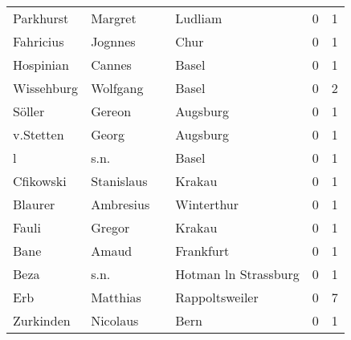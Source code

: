 \begin{center}
\begin{tiny}
\begin{longtabu}{llllrr}
                Parkhurst &                            Margret &             &                                     Ludliam &          0 &         1 \\
                Fahricius &                            Jognnes &             &                                        Chur &          0 &         1 \\
                Hospinian &                             Cannes &             &                                       Basel &          0 &         1 \\
               Wissehburg &                           Wolfgang &             &                                       Basel &          0 &         2 \\
                   Söller &                             Gereon &             &                                    Augsburg &          0 &         1 \\
                v.Stetten &                              Georg &             &                                    Augsburg &          0 &         1 \\
                        l &                               s.n. &             &                                       Basel &          0 &         1 \\
                Cfikowski &                         Stanislaus &             &                                      Krakau &          0 &         1 \\
                  Blaurer &                          Ambresius &             &                                  Winterthur &          0 &         1 \\
                    Fauli &                             Gregor &             &                                      Krakau &          0 &         1 \\
                     Bane &                              Amaud &             &                                   Frankfurt &          0 &         1 \\
                     Beza &                               s.n. &             &                        Hotman ln Strassburg &          0 &         1 \\
                      Erb &                           Matthias &             &                              Rappoltsweiler &          0 &         7 \\
                Zurkinden &                           Nicolaus &             &                                        Bern &          0 &         1 \\

\end{longtabu}
\end{tiny}
\end{center}
